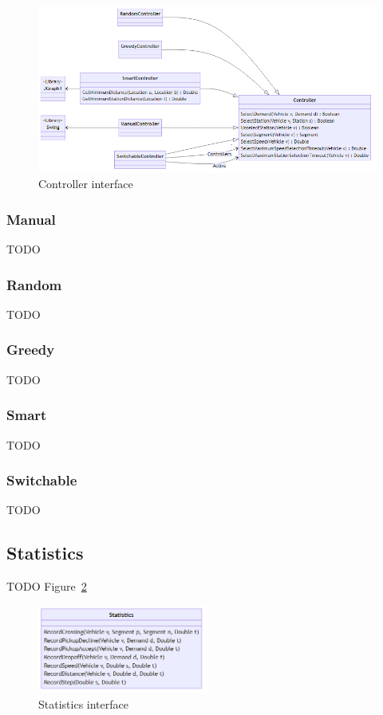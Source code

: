 \documentclass{article}
\begin{document}
    \begin{figure}[htbp]
        \centering
        \includegraphics[width=\textwidth]{../../diagrams/controller/classes.png}
        \caption{Controller interface}
        \label{fig:2}
    \end{figure}

    \subsubsection{Manual}
    TODO

    \subsubsection{Random}
    TODO
    
    \subsubsection{Greedy}
    TODO

    \subsubsection{Smart}
    TODO

    \subsubsection{Switchable}
    TODO

    \subsection{Statistics}
    \label{sec:statistics}
    TODO Figure~\ref{fig:3}

    \begin{figure}[htbp]
        \centering
        \includegraphics[width=0.5\textwidth]{../../diagrams/statistics/classes.png}
        \caption{Statistics interface}
        \label{fig:3}
    \end{figure}
\end{document}
